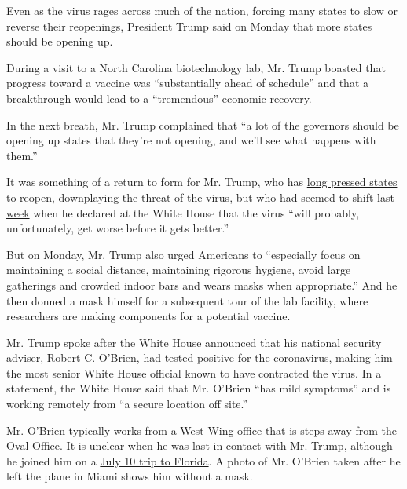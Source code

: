 Even as the virus rages across much of the nation, forcing many states
to slow or reverse their reopenings, President Trump said on Monday that
more states should be opening up.

During a visit to a North Carolina biotechnology lab, Mr. Trump boasted
that progress toward a vaccine was ``substantially ahead of schedule''
and that a breakthrough would lead to a ``tremendous'' economic
recovery.

In the next breath, Mr. Trump complained that ``a lot of the governors
should be opening up states that they're not opening, and we'll see what
happens with them.''

It was something of a return to form for Mr. Trump, who has
\href{https://www.nytimes3xbfgragh.onion/2020/04/17/us/politics/trump-coronavirus-governors.html}{long
pressed states to reopen}, downplaying the threat of the virus, but who
had
\href{https://www.nytimes3xbfgragh.onion/2020/07/21/us/politics/trump-coronavirus-masks.html}{seemed
to shift last week} when he declared at the White House that the virus
``will probably, unfortunately, get worse before it gets better.''

But on Monday, Mr. Trump also urged Americans to ``especially focus on
maintaining a social distance, maintaining rigorous hygiene, avoid large
gatherings and crowded indoor bars and wears masks when appropriate.''
And he then donned a mask himself for a subsequent tour of the lab
facility, where researchers are making components for a potential
vaccine.

Mr. Trump spoke after the White House announced that his national
security adviser,
\href{https://www.nytimes3xbfgragh.onion/2020/07/27/us/politics/robert-obrien-virus.html}{Robert
C. O'Brien, had tested positive for the coronavirus}, making him the
most senior White House official known to have contracted the virus. In
a statement, the White House said that Mr. O'Brien ``has mild symptoms''
and is working remotely from ``a secure location off site.''

Mr. O'Brien typically works from a West Wing office that is steps away
from the Oval Office. It is unclear when he was last in contact with Mr.
Trump, although he joined him on a
\href{https://www.nytimes3xbfgragh.onion/2020/07/10/us/politics/trump-florida-maduro.html}{July
10 trip to Florida}. A photo of Mr. O'Brien taken after he left the
plane in Miami shows him without a mask.

\href{https://www.nytimes3xbfgragh.onion/interactive/2020/07/27/upshot/coronavirus-pooled-testing.html}{}

